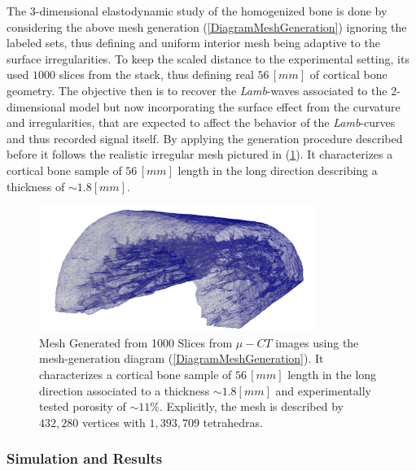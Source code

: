 The 3-dimensional elastodynamic study of the homogenized bone is done by considering the above mesh generation (\ref{DiagramMeshGeneration}) ignoring the labeled sets, thus defining and uniform interior mesh being adaptive to the surface irregularities.
To keep the scaled distance to the experimental setting, its used $1000$ slices from the stack, thus defining real $56 \, [mm]$ of cortical bone geometry.
The objective then is to recover the \textit{Lamb}-waves associated to the 2-dimensional model but now incorporating the surface effect from the curvature and irregularities, that are expected to affect the behavior of the \textit{Lamb}-curves and thus recorded signal itself.
By applying the generation procedure described before it follows the realistic irregular mesh pictured in (\ref{HomBoneMeshFile}). It characterizes a cortical bone sample of $56 \, [mm]$ length in the long direction describing a thickness of $\sim 1.8 [mm]$. 

\begin{figure}[!h]
	\centering
	\includegraphics[width=0.8\textwidth]{images/ImgExt/CorticalBoneS1000OPT20-View.png}
	\caption{Mesh Generated from 1000 Slices from $\mu-CT$ images using the mesh-generation diagram (\ref{DiagramMeshGeneration}). It characterizes a cortical bone sample of $56 \, [mm]$ length in the long direction associated to a thickness $\sim 1.8 [mm]$ and experimentally tested porosity of $\sim 11 \%$. Explicitly, the mesh is described by $432,280$ vertices with $1,393,709$ tetrahedras.}
	\label{HomBoneMeshFile}
\end{figure} 

 \subsubsection{Simulation and Results}

